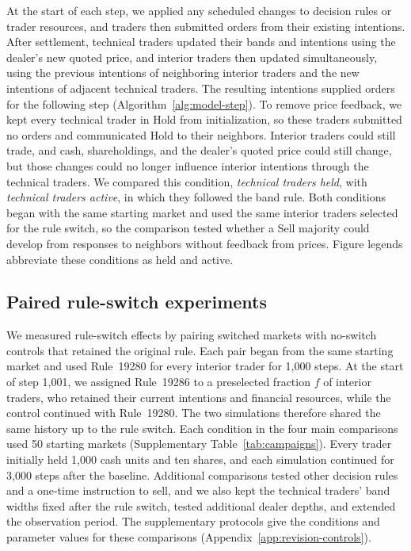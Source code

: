 At the start of each step, we applied any scheduled changes to decision
rules or trader resources, and traders then submitted orders from their
existing intentions. After settlement, technical traders updated their
bands and intentions using the dealer's new quoted price, and interior
traders then updated simultaneously, using the previous intentions of
neighboring interior traders and the new intentions of adjacent
technical traders. The resulting intentions supplied orders for the
following step (Algorithm~\ref{alg:model-step}). To remove price
feedback, we kept every technical trader in Hold from initialization, so
these traders submitted no orders and communicated Hold to their
neighbors. Interior traders could still trade, and cash, shareholdings,
and the dealer's quoted price could still change, but those changes
could no longer influence interior intentions through the technical
traders. We compared this condition, \emph{technical traders held}, with
\emph{technical traders active}, in which they followed the band rule.
Both conditions began with the same starting market and used the same
interior traders selected for the rule switch, so the comparison tested
whether a Sell majority could develop from responses to neighbors
without feedback from prices. Figure legends abbreviate these conditions
as held and active.
\subsection{Paired rule-switch experiments}

We measured rule-switch effects by pairing switched markets with
no-switch controls that retained the original rule. Each
pair began from the same starting market and used Rule~19280 for every
interior trader for 1,000 steps. At the start of step 1,001, we assigned
Rule~19286 to a preselected fraction $f$ of interior traders, who
retained their current intentions and financial resources, while the
control continued with Rule~19280. The two simulations therefore shared
the same history up to the rule switch. Each condition in the four main
comparisons used 50 starting markets (Supplementary
Table~\ref{tab:campaigns}). Every trader initially held 1,000 cash units
and ten shares, and each simulation continued for 3,000 steps after the
baseline. Additional comparisons tested other decision rules and a
one-time instruction to sell, and we also kept the technical traders'
band widths fixed after the rule switch, tested additional dealer
depths, and extended the observation period. The supplementary protocols
give the conditions and parameter values for these comparisons
(Appendix~\ref{app:revision-controls}).

